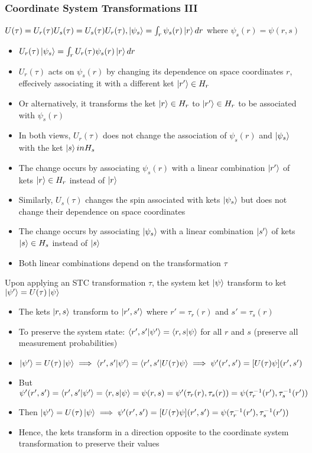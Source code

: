 \documentclass[8pt,t,mathserif,aspectratio=169]{beamer}
\begin{document}
\begin{frame}
  \frametitle{Coordinate System Transformations III}
  \vspace{1mm}
  $U(\tau) = U_r(\tau) U_s(\tau) = U_s(\tau) U_r(\tau), \ket{\psi_s} = \int_r \psi_s(r) \ket{r} dr$ where $\psi_s(r) = \psi(r,s)$
  \begin{itemize}
    \item $U_r(\tau) \ket{\psi_s} = \int_r U_r(\tau) \psi_s(r) \ket{r} dr$
    \item $U_r(\tau)$ acts on $\psi_s(r)$ by changing its dependence on space coordinates $r$, effecively associating it with a different ket $\ket{r'} \in H_r$
    \item Or alternatively, it transforms the ket $\ket{r} \in H_r$ to $\ket{r'} \in H_r$ to be associated with $\psi_s(r)$
    \item In both views, $U_r(\tau)$ does not change the association of $\psi_s(r)$ and $\ket{\psi_s}$ with the ket $\ket{s} in H_s$
    
    
    \item The change occurs by associating $\psi_s(r)$ with a linear combination $\ket{r'}$ of kets $\ket{r} \in H_r$ instead of $\ket{r}$
    \item Similarly, $U_s(\tau)$ changes the spin associated with kets $\ket{\psi_s}$ but does not change their dependence on space coordinates
    \item The change occurs by associating $\ket{\psi_s}$ with a linear combination $\ket{s'}$ of kets $\ket{s} \in H_s$ instead of $\ket{s}$
    \item Both linear combinations depend on the transformation $\tau$
  \end{itemize}
  Upon applying an STC transformation $\tau$, the system ket $\ket{\psi}$ transform to ket $\ket{\psi'} = U(\tau) \ket{\psi}$
  \begin{itemize}
    \item The kets $\ket{r,s}$ transform to $\ket{r',s'}$ where $r' = \tau_r(r)$ and $s' = \tau_s(r)$
    \item To preserve the system state: $\braket{r',s'}{\psi'} = \braket{r,s}{\psi}$ for all $r$ and $s$ (preserve all measurement probabilities)
    \item $\ket{\psi'} = U(\tau) \ket{\psi} \implies \braket{r',s'}{\psi'} = \braket{r',s'}{U(\tau) \psi} \implies \psi'(r',s') = [U(\tau) \psi](r',s')$
    \item But $\psi'(r',s') = \braket{r',s'}{\psi'} = \braket{r,s}{\psi} = \psi(r,s) = \psi'(\tau_r(r),\tau_s(r)) = \psi(\tau^{-1}_r(r'),\tau^{-1}_s(r'))$ 
    \item Then $\ket{\psi'} = U(\tau) \ket{\psi} \implies \psi'(r',s') = [U(\tau) \psi](r',s') = \psi(\tau^{-1}_r(r'),\tau^{-1}_s(r'))$
    \item Hence, the kets transform in a direction opposite to the coordinate system transformation to preserve their values
  \end{itemize}
\end{frame}
\end{document}
